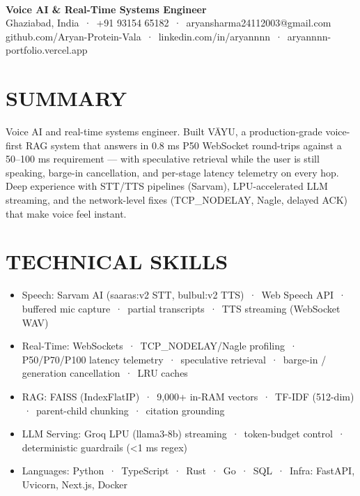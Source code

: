 \documentclass[9pt]{article}
\begin{document}
\\[3pt]
{\large\bfseries Voice AI \& Real-Time Systems Engineer}\\[3pt]
{\small\color{greyc} Ghaziabad, India \,·\, +91 93154 65182 \,·\, aryansharma24112003@gmail.com}\vspace{-2pt}
{\small\color{greyc} github.com/Aryan-Protein-Vala \,·\, linkedin.com/in/aryannnn \,·\, aryannnn-portfolio.vercel.app}\vspace{-2pt}
\section*{SUMMARY}
Voice AI and real-time systems engineer. Built VĀYU, a production-grade voice-first RAG system that answers in 0.8 ms P50 WebSocket round-trips against a 50–100 ms requirement  ---  with speculative retrieval while the user is still speaking, barge-in cancellation, and per-stage latency telemetry on every hop. Deep experience with STT/TTS pipelines (Sarvam), LPU-accelerated LLM streaming, and the network-level fixes (TCP\_NODELAY, Nagle, delayed ACK) that make voice feel instant.
\vspace{1pt}
\section*{TECHNICAL SKILLS}
\begin{itemize}[leftmargin=11pt,itemsep=0pt,topsep=1pt,parsep=0pt]
\item Speech: Sarvam AI (saaras:v2 STT, bulbul:v2 TTS) \,·\, Web Speech API \,·\, buffered mic capture \,·\, partial transcripts \,·\, TTS streaming (WebSocket WAV)
\item Real-Time: WebSockets \,·\, TCP\_NODELAY/Nagle profiling \,·\, P50/P70/P100 latency telemetry \,·\, speculative retrieval \,·\, barge-in / generation cancellation \,·\, LRU caches
\item RAG: FAISS (IndexFlatIP) \,·\, 9,000+ in-RAM vectors \,·\, TF-IDF (512-dim) \,·\, parent-child chunking \,·\, citation grounding
\item LLM Serving: Groq LPU (llama3-8b) streaming \,·\, token-budget control \,·\, deterministic guardrails (<1 ms regex)
\item Languages: Python \,·\, TypeScript \,·\, Rust \,·\, Go \,·\, SQL \,·\, Infra: FastAPI, Uvicorn, Next.js, Docker
\end{itemize}
\end{document}
